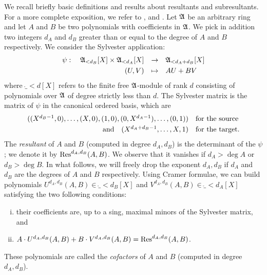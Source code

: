 \documentclass{article}
\begin{document}
We recall briefly basic definitions and results about resultants and 
subresultants. For a more complete exposition, we refer to \cite[\S 
4.2]{real}, \cite[\S 3.3]{cohen} and \cite[\S 4.1]{winkler}. Let $\mathfrak A$ 
be an arbitrary ring and let $A$ and $B$ be two polynomials with 
coefficients in $\mathfrak A$. We pick in addition two integers $d_A$ and 
$d_B$ greater than or equal to the degree of $A$ and $B$ respectively. 
We consider the Sylvester application:
$$\begin{array}{rcl}
\psi : \quad
\ring_{< d_B}[X] \times \ring_{< d_A}[X] & \to &
\ring_{< d_A+d_B}[X] \smallskip \\
(U,V) & \mapsto & AU + BV
\end{array}$$
where $\ring_{<d}[X]$ refers to the finite free $\mathfrak A$-module of
rank $d$ consisting of polynomials over $\mathfrak A$ of degree strictly 
less than $d$.
The Sylvester matrix is the matrix of $\psi$ in the canonical ordered
basis, which are
$$\begin{array}{rl}
((X^{d_B-1},0), \ldots, (X,0), (1,0), (0,X^{d_A-1}), \ldots, (0,1)) &
\text{for the source} \smallskip \\
\text{and} \quad (X^{d_A+d_B-1}, \ldots, X, 1) &
\text{for the target.}
\end{array}$$
The \emph{resultant} of $A$ and $B$ (computed in degree $d_A, d_B$) is the 
determinant of the $\psi$; we denote it by $\text{\rm Res}^{d_A,d_B}(A,B)$. We 
observe that it vanishes if $d_A > \deg A$ or $d_B > \deg B$. In what 
follows, we will freely drop the exponent $d_A, d_B$ if $d_A$ and $d_B$ 
are the degrees of $A$ and $B$ respectively.
Using Cramer formulae, we can build polynomials $U^{d_A, d_B}(A,B) \in
\ring_{< d_B}[X]$ and $V^{d_A, d_B}(A,B) \in \ring_{< d_A}[X]$ 
satisfying the two following conditions:
\begin{enumerate}[i)]
\item their coefficients are, up to a sing, maximal minors of the 
Sylvester matrix, and
\item $A \cdot U^{d_A, d_B}(A,B) + B \cdot V^{d_A, d_B}(A,B) = 
\text{\rm Res}^{d_A, d_B}(A,B)$.
\end{enumerate}
These polynomials are called the \emph{cofactors} of $A$ and $B$
(computed in degree $d_A, d_B$).

\medskip
\end{document}
